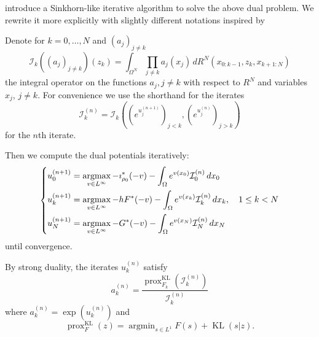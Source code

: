 \documentclass{article}
\newcommand{\calI}{\mathcal{I}}
\DeclareMathOperator*{\argmin}{argmin}
\DeclareMathOperator*{\argmax}{argmax}
\DeclareMathOperator{\KL}{KL}
\DeclareMathOperator{\prox}{prox}
\begin{document}
	
    \textcite{benamou2018entropy} introduce a Sinkhorn-like iterative algorithm to solve the above dual problem. We rewrite it more explicitly with slightly different notations inspired by \cite{chizat2016scaling}
    \begin{thmalgo}
   	Denote for $k=0,\ldots,N$ and $(a_j)_{j\neq k}$
   	\[
   		\calI_k((a_j)_{j\neq k})(z_k) = 
   		\int_{\Omega^N} \prod_{j\neq k} a_j(x_j)\,
   		dR^N(x_{0:k-1}, z_k, x_{k+1:N})
   	\]
   	the integral operator on the functions $a_j,j\neq k$ with respect to $R^N$ and variables $x_j$, $j\neq k$.
   	For convenience we use the shorthand for the iterates
   	\[
   		\calI_k^{(n)} = \calI_k\left(\left(e^{u^{(n+1)}_j}\right)_{j<k}, \left(e^{u^{(n)}_j}\right)_{j>k}\right)
   	\]
   	for the $n$th iterate.
   	
   	Then we compute the dual potentials iteratively:
   	\begin{equation}
	   	\begin{dcases}
	   	u_0^{(n+1)} = \argmax_{v \in L^\infty} -\imath_{\rho_0}^*(-v) - \int_{\Omega} e^{v(x_0)} \calI_0^{(n)} \,dx_0 \\
	   	u_k^{(n+1)} = \argmax_{v \in L^\infty} -hF^*(-v) - \int_{\Omega} e^{v(x_k)} \calI_k^{(n)} \,dx_k,\quad 1\leq k < N \\
	   	u_N^{(n+1)} = \argmax_{v \in L^\infty} -G^*(-v) - \int_{\Omega} e^{v(x_N)} \calI_N^{(n)} \,dx_N
	   	\end{dcases}
   	\end{equation}
  	until convergence.
	
	By strong duality, the iterates $u_k^{(n)}$ satisfy
	\begin{equation}
		a_k^{(n)} =
		\frac{
			\prox_{F_k}^{\KL}(\calI_k^{(n)})
		}{
			\calI_k^{(n)}
		}
	\end{equation}
	where $a^{(n)}_k = \exp(u^{(n)}_k)$ and
	\[
		\prox_F^{\KL}(z) = \argmin_{s\in L^1} F(s) + \KL(s|z).
	\]
	\end{thmalgo}
    
\end{document}
